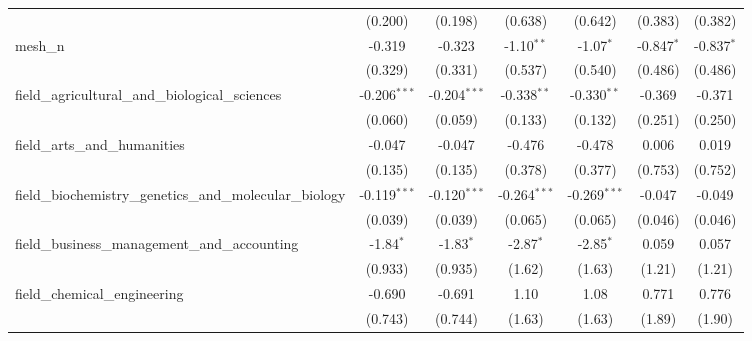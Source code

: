 \begin{tabular}{lcccccc}
                                                               & (0.200)        & (0.198)        & (0.638)        & (0.642)        & (0.383)        & (0.382)\\   
   mesh\_n                                                     & -0.319         & -0.323         & -1.10$^{**}$   & -1.07$^{*}$    & -0.847$^{*}$   & -0.837$^{*}$\\   
                                                               & (0.329)        & (0.331)        & (0.537)        & (0.540)        & (0.486)        & (0.486)\\   
   field\_agricultural\_and\_biological\_sciences              & -0.206$^{***}$ & -0.204$^{***}$ & -0.338$^{**}$  & -0.330$^{**}$  & -0.369         & -0.371\\   
                                                               & (0.060)        & (0.059)        & (0.133)        & (0.132)        & (0.251)        & (0.250)\\   
   field\_arts\_and\_humanities                                & -0.047         & -0.047         & -0.476         & -0.478         & 0.006          & 0.019\\   
                                                               & (0.135)        & (0.135)        & (0.378)        & (0.377)        & (0.753)        & (0.752)\\   
   field\_biochemistry\_genetics\_and\_molecular\_biology      & -0.119$^{***}$ & -0.120$^{***}$ & -0.264$^{***}$ & -0.269$^{***}$ & -0.047         & -0.049\\   
                                                               & (0.039)        & (0.039)        & (0.065)        & (0.065)        & (0.046)        & (0.046)\\   
   field\_business\_management\_and\_accounting                & -1.84$^{*}$    & -1.83$^{*}$    & -2.87$^{*}$    & -2.85$^{*}$    & 0.059          & 0.057\\   
                                                               & (0.933)        & (0.935)        & (1.62)         & (1.63)         & (1.21)         & (1.21)\\   
   field\_chemical\_engineering                                & -0.690         & -0.691         & 1.10           & 1.08           & 0.771          & 0.776\\   
                                                               & (0.743)        & (0.744)        & (1.63)         & (1.63)         & (1.89)         & (1.90)\\   

\end{tabular}
